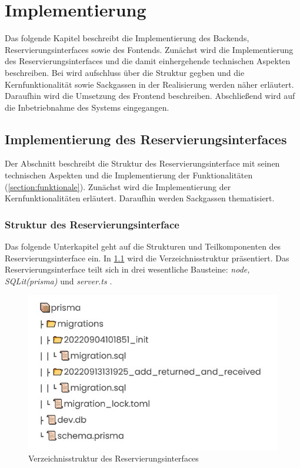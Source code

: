 
\chapter{Implementierung}
\label{chapter-implementierung}
Das folgende Kapitel beschreibt die Implementierung des Backends,
Reservierungsinterfaces sowie des Fontends. Zunächst wird die Implementierung
des Reservierungsinterfaces und die damit einhergehende technischen Aspekten
beschreiben. Bei wird aufschluss über die Struktur gegben und die
Kernfunktionalität sowie Sackgassen in der Realisierung werden näher erläutert.
Daraufhin wird die Umsetzung des Frontend beschreiben. Abschließend wird auf die
Inbetriebnahme des Systems eingegangen.


\section{Implementierung des Reservierungsinterfaces}
Der Abschnitt beschreibt die Struktur des Reservierungsinterface mit seinen
technischen Aspekten und die Implementierung der Funktionalitäten
(\ref{section:funktionale}). Zunächst wird die Implementierung der
Kernfunktionalitäten erläutert. Daraufhin werden Sackgassen thematisiert.


\subsection{Struktur des Reservierungsinterface}
Das folgende Unterkapitel geht auf die Strukturen und Teilkomponenten des
Reservierungsinterface ein. In \ref{fig:db} wird die Verzeichnisstruktur
präsentiert. Das Reservierungsinterface teilt sich in drei wesentliche
Bausteine: \textit{node, SQLit(prisma)} und \textit{server.ts} .

\begin{figure}[h]
  \centering
  \includegraphics[scale=0.7]{Bilder/Db.jpg}
  \caption[Verzeichnisstruktur des Reservierungsinterfaces]{Verzeichnisstruktur des Reservierungsinterfaces}
  \label{fig:db}
\end{figure}

